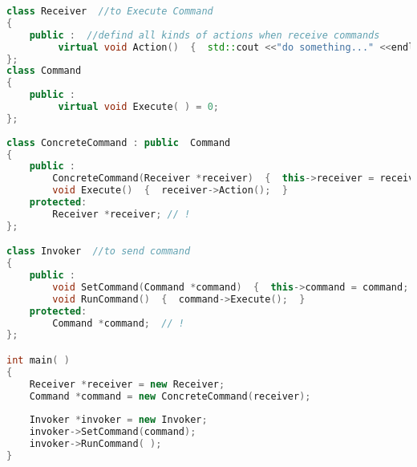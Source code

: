 \documentclass{book}
\begin{document}
\begin{lstlisting}[caption={Command pattern sample code 2, commandexample.cpp},label={lst:cm},language=C++]
class Receiver  //to Execute Command
{  
    public :  //defind all kinds of actions when receive commands 
         virtual void Action()  {  std::cout <<"do something..." <<endl;  }  
};  
class Command  
{  
    public :  
         virtual void Execute( ) = 0;
};  
  
class ConcreteCommand : public  Command  
{  
    public :  
        ConcreteCommand(Receiver *receiver)  {  this->receiver = receiver; }  
        void Execute()  {  receiver->Action();  }  
    protected:  
        Receiver *receiver; // !  
};  

class Invoker  //to send command
{  
    public :  
        void SetCommand(Command *command)  {  this->command = command;  }  
        void RunCommand()  {  command->Execute();  }  
    protected:  
        Command *command;  // !
};  

int main( )  
{  
    Receiver *receiver = new Receiver;  
    Command *command = new ConcreteCommand(receiver);  
  
    Invoker *invoker = new Invoker;  
    invoker->SetCommand(command);
    invoker->RunCommand( );     
}  
\end{lstlisting}
\end{document}
